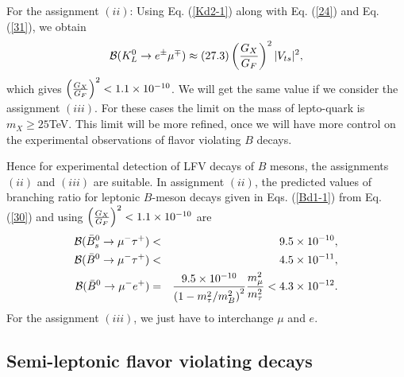 \documentclass{ws-ijmpa}
\begin{document}
For the assignment $(ii)$: Using Eq. (\ref{Kd2-1}) along with Eq. (\ref{24}) and Eq. (\ref{31}), we obtain
\begin{equation}
\mathcal{B}(K^{0}_{L}\rightarrow e^{\pm}\mu^{\mp}) \approx (27.3) \left({G_X\over G_F}\right)^2|V_{ts}|^2 \label{Bound-K2},
\end{equation}
which gives $\left({G_X\over G_F}\right)^2 < 1.1 \times 10^{-10}$. We will get the same value if we consider the assignment $(iii)$. For these cases the limit on the mass of lepto-quark is $m_{X}\geq 25$TeV. This limit will be more refined, once we will have more control on the experimental observations of flavor violating $B$ decays.

Hence for experimental detection of LFV decays of $B$ mesons, the assignments $(ii)$ and $(iii)$ are suitable. In assignment $(ii)$, the predicted values of branching ratio for leptonic $B$-meson decays given in Eqs. (\ref{Bd1-1}) from Eq. (\ref{30}) and using  $\left({G_X\over G_F}\right)^2 < 1.1 \times 10^{-10}$ are
\begin{eqnarray}
\mathcal{B}(\bar{B}_{s}^{0}  \to  \mu^{-}\tau^{+}) & < & 9.5\times 10^{-10} \notag ,\\
\mathcal{B}(\bar{B}^{0}  \to  \mu^{-}\tau^{+}) & < & 4.5 \times 10^{-11} \notag ,\\
\mathcal{B}(\bar{B}^{0}  \to  \mu^{-}e^{+})  & = &\frac{9.5 \times 10^{-10}}{\left(1-m_{\tau}^2/m^{2}_{B}\right)^2}\frac{m^2_{\mu}}{m^2_{\tau}} < 4.3\times 10^{-12} \notag .
\end{eqnarray}
For the assignment $(iii)$, we just have to interchange $\mu$ and $e$.

\subsection{Semi-leptonic flavor violating decays}
\end{document}
